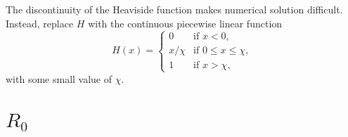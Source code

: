 \documentclass{article}
\begin{document}
The discontinuity of the Heaviside function makes numerical solution
difficult.  Instead, replace $H$ with the continuous piecewise linear
function
\begin{equation}
  H(x) =
  \begin{cases}
    0 & \text{if $x < 0$},
    \\
    x / \chi & \text{if $0 \leq x \leq \chi$},
    \\
    1 & \text{if $x > \chi$},
  \end{cases}
\end{equation}
with some small value of $\chi$.


\section{$R_0$}
\end{document}
